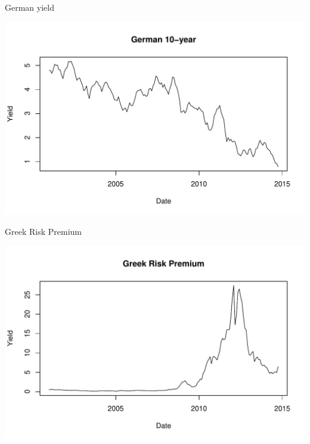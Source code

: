 \documentclass[14pt,xcolor=pdftex,dvipsnames,table]{beamer}\usepackage[]{graphicx}\usepackage[]{color}
\makeatletter
\def\maxwidth{ %
  \ifdim\Gin@nat@width>\linewidth
    \linewidth
  \else
    \Gin@nat@width
  \fi
}
\newenvironment{knitrout}{}{} %
\makeatother
\begin{document}
\begin{frame}{German yield}
\begin{knitrout}
\color{fgcolor}

{\centering \includegraphics[width=\maxwidth]{figure/yield-1} 

}



\end{knitrout}
\end{frame}

\begin{frame}{Greek Risk Premium}
\begin{knitrout}
\color{fgcolor}

{\centering \includegraphics[width=\maxwidth]{figure/yield2-1} 

}



\end{knitrout}
\end{frame}
\end{document}
